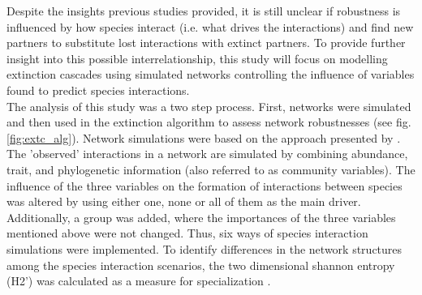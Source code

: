 \documentclass[12pt,a4paper]{article}
\begin{document}



Despite the insights previous studies provided, it is still unclear if robustness is influenced by how species interact (i.e. what drives the interactions) and find new partners to substitute lost interactions with extinct partners. To provide further insight into this possible interrelationship, this study will focus on modelling extinction cascades using simulated networks controlling the influence of variables found to predict species interactions.\\


The analysis of this study was a two step process. First, networks were simulated and then used in the extinction algorithm to assess network robustnesses (see fig. \ref{fig:extc_alg}).  
Network simulations were based on the approach presented by \citeauthor{Benadi2022} \parencite{Benadi2022}. The 'observed' interactions in a network are simulated by combining abundance, trait, and phylogenetic information (also referred to as community variables). The influence of the three variables on the formation of interactions between species was altered by using either one, none or all of them as the main driver. Additionally, a group was added, where the importances of the three variables mentioned above were not changed. Thus, six ways of species interaction simulations were implemented.
To identify differences in the network structures among the species interaction scenarios, the two dimensional shannon entropy (H2') was calculated as a measure for specialization \parencite{Bluethgen2006}.



	
\end{document}
